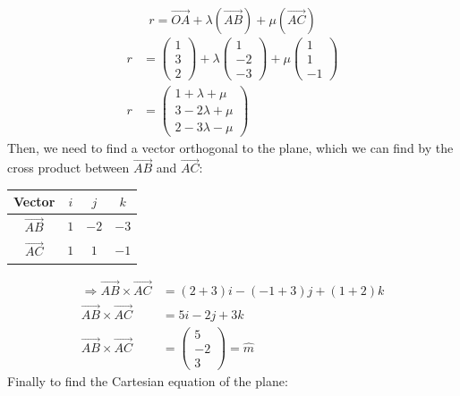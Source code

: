 \documentclass[hidelinks, a4paper, 12pt]{article}
\newcommand{\thus}{\Rightarrow}
\newcommand{\mhat}{\hat{m}}
\begin{document}
            \[r = \vec{OA} + \lambda (\vec{AB}) + \mu (\vec{AC})\]
            \[\begin{split}
                r &= \begin{pmatrix} 1\\3\\2 \end{pmatrix} + \lambda \begin{pmatrix} 1\\-2\\-3 \end{pmatrix} + \mu \begin{pmatrix} 1\\1\\-1 \end{pmatrix}\\
                r &= \begin{pmatrix} 1 + \lambda + \mu \\ 3 -2\lambda +\mu \\ 2 -3\lambda -\mu \end{pmatrix}   
            \end{split}\]
            Then, we need to find a vector orthogonal to the plane, which we can find by the cross product between $\vec{AB}$ and $\vec{AC}$:
            \begin{center}
                \begin{tabular}{|c || c | c | c|} 
                \hline
                Vector & $i$ & $j$ & $k$ \\
                \hline
                $\vec{AB}$ & $1$ & $-2$ & $-3$ \\ 
                \hline
                $\vec{AC}$ & $1$ & $1$ & $-1$ \\
                \hline
               \end{tabular}
            \end{center}
            \[\begin{split}
                \thus\vec{AB}\times\vec{AC} &= (2+3)i - (-1+3)j + (1+2)k\\
                \vec{AB}\times\vec{AC} &= 5i - 2j + 3k\\
                \vec{AB}\times\vec{AC} &= \begin{pmatrix} 5 \\ -2 \\ 3 \end{pmatrix} = \mhat
            \end{split}\]
            Finally to find the Cartesian equation of the plane:
\end{document}
